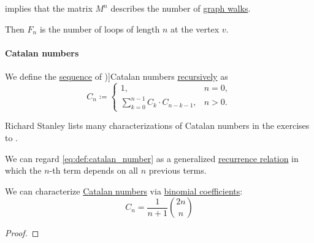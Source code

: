 \begin{example}
\begin{thmenum}
     implies that the matrix \( M^n \) describes the number of \hyperref[def:graph_walk]{graph walks}.

    Then \( F_n \) is the number of loops of length \( n \) at the vertex \( v \).
  \end{thmenum}
\end{example}

\paragraph{Catalan numbers}

\begin{definition}\label{def:catalan_number}
  We define the \hyperref[def:sequence]{sequence} of \term[ru=число Каталана (\cite[\S 5.7.4]{Новиков2013ДискретнаяМатематика})]{Catalan numbers} \hyperref[rem:natural_number_recursion]{recursively} as
  \begin{equation}\label{eq:def:catalan_number}
    C_n \coloneqq \begin{cases}
      1,                                    &n = 0, \\
      \sum_{k=0}^{n-1} C_k \cdot C_{n-k-1}, &n > 0.
    \end{cases}
  \end{equation}
\end{definition}
\begin{comments}
  \item Richard Stanley lists many characterizations of Catalan numbers in the exercises to \cite[ch. 6]{Stanley2023EnumCombinatoricsVol2}.

  \item We can regard \eqref{eq:def:catalan_number} as a generalized \hyperref[def:recurrence_relation]{recurrence relation} in which the \( n \)-th term depends on all \( n \) previous terms.
\end{comments}

\begin{proposition}\label{thm:catalan_number_via_binomial_coefficients}
  We can characterize \hyperref[def:catalan_number]{Catalan numbers} via \hyperref[def:binomial_coefficient]{binomial coefficients}:
  \begin{equation}\label{eq:thm:catalan_number_via_binomial_coefficients}
    C_n = \frac 1 {n + 1} \binom {2n} n
  \end{equation}
\end{proposition}
\begin{proof}
\end{proof}

